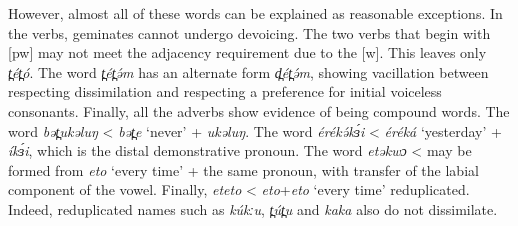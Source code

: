 However, almost all of these words can be explained as reasonable exceptions. In the verbs, geminates cannot undergo devoicing. The two verbs that begin with [pw] may not meet the adjacency requirement due to the [w]. This leaves only \textit{t̪ét̪ó}. The word \textit{t̪ét̪ə́m} has an alternate form \textit{d̪ét̪ə́m}, showing vacillation between respecting dissimilation and respecting a preference for initial voiceless consonants. Finally, all the adverbs show evidence of being compound words. The word \textit{bət̪ukəluŋ} < \textit{bət̪e} ‘never’ + \textit{ukəluŋ}. The word \textit{érékə́kɜ́i} < \textit{éréká} ‘yesterday’ + \textit{íkɜ́i}, which is the distal demonstrative pronoun. The word \textit{etəkwɔ} < may be formed from \textit{eto} ‘every time’ + the same pronoun, with transfer of the labial component of the vowel. Finally, \textit{eteto} < \textit{eto}+\textit{eto} ‘every time’ reduplicated. Indeed, reduplicated names such as \textit{kúkːu}, \textit{t̪út̪u} and \textit{kaka} also do not dissimilate.